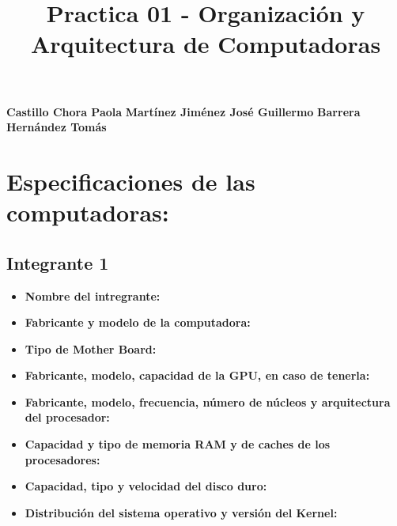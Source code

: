 \documentclass[12pt]{article}
\newcommand{\pl}[1]{\item \textbf{ #1 }}
\begin{document}

%

\title{Practica 01 - Organización y Arquitectura de Computadoras}
\begin{center}
    \textbf{Castillo Chora Paola}
    \textbf{Martínez Jiménez José Guillermo}
    \textbf{Barrera Hernández Tomás}
    
\end{center}

\section{Especificaciones de las computadoras:}
\subsection{Integrante 1}
\begin{itemize}
    \pl{Nombre del intregrante:}

    \pl{Fabricante y modelo de la computadora:}

    \pl{Tipo de Mother Board:}

    \pl{Fabricante, modelo, capacidad de la GPU, en caso de tenerla:}

    \pl{Fabricante, modelo, frecuencia, número de núcleos y arquitectura del procesador:}

    \pl{Capacidad y tipo de memoria RAM y de caches de los procesadores:}

    \pl{Capacidad, tipo y velocidad del disco duro:}

    \pl{Distribución del sistema operativo y versión del Kernel:}
\end{itemize}
\end{document}
